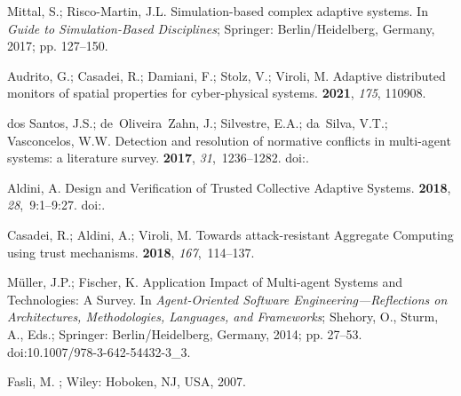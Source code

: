 \documentclass[jsan,article,accept,moreauthors,pdftex]{Definitions/mdpi}
\begin{document}
\begin{thebibliography}{999}
Mittal, S.; Risco-Martin, J.L.
\newblock Simulation-based complex adaptive systems. In {\em Guide to
  Simulation-Based Disciplines}; Springer: Berlin/Heidelberg, Germany, %
  2017; pp. 127--150.

Audrito, G.; Casadei, R.; Damiani, F.; Stolz, V.; Viroli, M.
\newblock Adaptive distributed monitors of spatial properties for
  cyber-physical systems.
 {\bf 2021}, \emph{175}, 110908.

dos Santos, J.S.; de~Oliveira~Zahn, J.; Silvestre, E.A.; da~Silva, V.T.;
  Vasconcelos, W.W.
\newblock Detection and resolution of normative conflicts in multi-agent
  systems: a literature survey.
 {\bf 2017}, {\em
  31},~1236--1282.
\newblock
  doi:{\href{https://doi.org/10.1007/s10458-017-9362-z}{}}.

Aldini, A.
\newblock Design and Verification of Trusted Collective Adaptive Systems.
 {\bf 2018}, {\em
  28},~9:1--9:27.
\newblock
  doi:{\href{https://doi.org/10.1145/3155337}{}}.

Casadei, R.; Aldini, A.; Viroli, M.
\newblock Towards attack-resistant Aggregate Computing using trust mechanisms.
 {\bf 2018}, {\em 167},~114--137.

M{\"{u}}ller, J.P.; Fischer, K.
\newblock Application Impact of Multi-agent Systems and Technologies: {A}
  Survey. In {\em Agent-Oriented Software Engineering---Reflections on
  Architectures, Methodologies, Languages, and Frameworks}; Shehory, O., Sturm,
  A., Eds.; Springer: Berlin/Heidelberg, Germany, 2014; pp. 27--53.
\newblock
  doi:10.1007/978-3-642-54432-3\_3.

Fasli, M.
; Wiley: Hoboken, NJ, USA, %
  2007.


\end{thebibliography}
\end{document}
